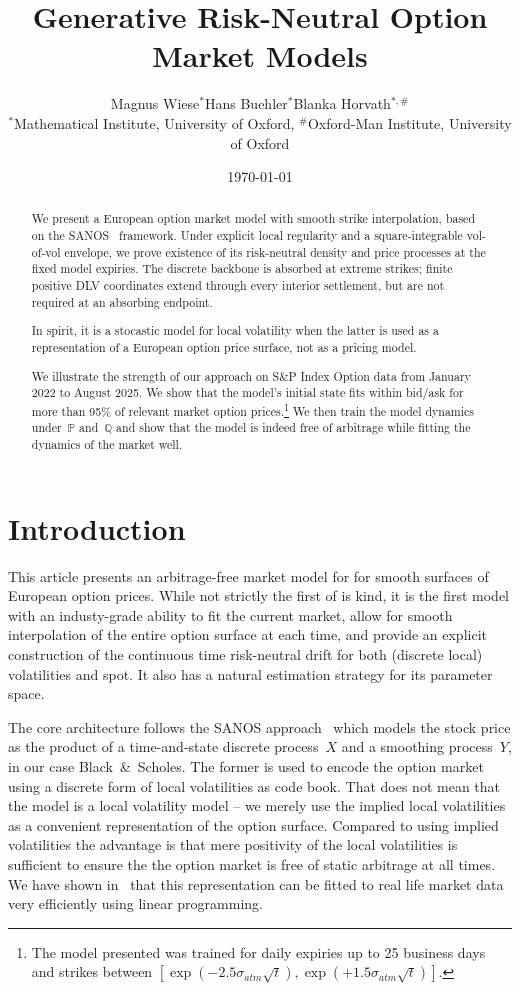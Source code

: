 \documentclass[11pt]{article}
\title{\textbf{Generative Risk-Neutral Option Market Models}}
\author{Magnus Wiese$^{*}$\qquad Hans Buehler$^{*}$\qquad Blanka Horvath$^{*,\#}$\\[0.6em]
{\small $^{*}$Mathematical Institute, University of Oxford, 
$^{\#}$Oxford-Man Institute, University of Oxford}}
\date{\today}
\newcommand{\Q}{\mathbb Q}
\newcommand{\PP}{\mathbb P}
\theoremstyle{plain}
\theoremstyle{definition}
\theoremstyle{remark}
\begin{document}
\maketitle

\begin{abstract}
We present a European option market model with smooth strike interpolation, based on the SANOS~\cite{SANOS2026} framework.
Under explicit local regularity and a square-integrable vol-of-vol envelope, we prove existence
of its risk-neutral density and price processes at the fixed model expiries. The discrete
backbone is absorbed at extreme strikes; finite positive DLV coordinates extend through
every interior settlement, but are not required at an absorbing endpoint.

In spirit,
it is a stocastic model for local volatility when the latter is used as a representation of a European option price surface, not as a pricing model.

We illustrate the strength of our approach on S\&P Index Option data from January 2022 to August 2025.
We show that the model's initial state fits within bid/ask for more than 95\% of relevant market option prices.\footnote{
The model presented was trained for daily expiries up to 25 business days and strikes between $[\exp(-2.5 \sigma_{atm} \sqrt{t}), \exp(+1.5 \sigma_{atm} \sqrt{t})]$.}
We then train the model dynamics under~$\PP$ and~$\Q$ and show that the model is indeed free of arbitrage
while fitting the dynamics of the market well.
\end{abstract}

\tableofcontents

\section{Introduction}\label{sec:intro}

This article presents an arbitrage-free market model for for smooth surfaces of European option prices. While not strictly the first of is kind,
it is the first model with an industy-grade ability to fit the current market, allow for smooth interpolation of the entire option surface at each time,
and provide an explicit construction of the continuous time risk-neutral drift for both (discrete local) volatilities and spot. It also has a natural
estimation strategy for its parameter space.

The core architecture follows the SANOS approach~\cite{SANOS2026} which models the stock price as the product
of a time-and-state discrete process~$X$ and a smoothing process~$Y$, in our case Black~\&~Scholes.
The former is used to encode the option market using a discrete form of local volatilities as code book. That does not mean
that the model is a local volatility model -- we merely use the implied local volatilities as a convenient representation of the option surface.
Compared to using implied volatilities the advantage is that mere positivity of the local volatilities is sufficient to ensure
the the option market is free of static arbitrage at all times. We have shown in~\cite{SANOS2026} that this representation
can be fitted to real life market data very efficiently using linear programming.
\end{document}
